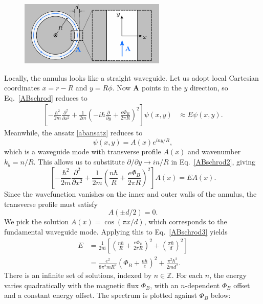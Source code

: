 \documentclass[prx,12pt]{revtex4-2}
\begin{document}
\begin{figure}[h]
  \centering\includegraphics[width=0.62\textwidth]{annuluszoom}
\end{figure}

\noindent
Locally, the annulus looks like a straight waveguide.  Let us adopt
local Cartesian coordinates $x = r - R$ and $y = R\phi$.  Now
$\mathbf{A}$ points in the $y$ direction, so Eq.~\eqref{ABschrod}
reduces to
\begin{align}
  \left[-\frac{\hbar^2}{2m} \frac{\partial^2}{\partial x^2}
    + \frac{1}{2m} \left(-i\hbar \frac{\partial}{\partial y} +
    \frac{e\Phi_B}{2\pi R} \right)^2 \right] \psi(x, y) &\approx E \psi(x, y).
  \label{ABschrod2}
\end{align}
Meanwhile, the ansatz \eqref{abansatz} reduces to
\begin{equation}
  \psi(x,y) = A(x) e^{iny/R},
\end{equation}
which is a waveguide mode with transverse profile $A(x)$ and
wavenumber $k_y = n/R$.  This allows us to substitute
$\partial/\partial y \rightarrow in/R$ in Eq.~\eqref{ABschrod2},
giving
\begin{equation}
  \left[-\frac{\hbar^2}{2m} \frac{\partial^2}{\partial x^2} +
    \frac{1}{2m} \left(\frac{n\hbar}{R} +
    \frac{e\Phi_B}{2\pi R} \right)^2 \right] A(x) = E A(x).
  \label{ABschrod3}
\end{equation}
Since the wavefunction vanishes on the inner and outer walls of the
annulus, the transverse profile must satisfy
\begin{equation}
  A(\pm d/2) = 0. \label{rboundcond} 
\end{equation}
We pick the solution $A(x) = \cos(\pi x / d)$, which corresponds to
the fundamental waveguide mode.  Applying this to
Eq.~\eqref{ABschrod3} yields
\begin{align}
  E &= \frac{1}{2m} \left[
    \left(\frac{n\hbar}{R} + \frac{e\Phi_B}{2\pi R}\right)^2
    + \left(\frac{\pi\hbar}{d}\right)^2 \right] \\
  &= \frac{e^2}{8\pi^2mR^2} \left(\Phi_B + \frac{nh}{e} \right)^2
  + \frac{\pi^2\hbar^2}{2md^2}.
  \label{abcurves}
\end{align}
There is an infinite set of solutions, indexed by $n \in \mathbb{Z}$.
For each $n$, the energy varies quadratically with the magnetic flux
$\Phi_B$, with an $n$-dependent $\Phi_B$ offset and a constant energy
offset.  The spectrum is plotted against $\Phi_B$ below:
\end{document}
